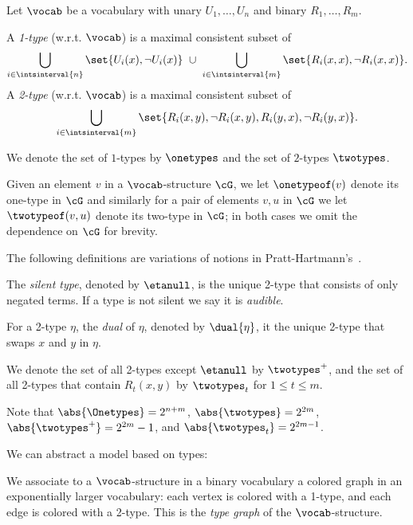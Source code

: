 Let $\vocab$ be a vocabulary with unary  $U_1, \ldots, U_n$ and binary  $R_1, \ldots, R_m$.
\begin{definition}
    A \emph{1-type} (w.r.t. $\vocab$) is a maximal consistent subset of
    \begin{equation*}
        \bigcup_{i \in \intsinterval{n}}\set{U_i(x), \neg U_i(x)}
        \ \cup\ 
        \bigcup_{i \in \intsinterval{m}}\set{R_i(x, x), \neg R_i(x, x)}.
    \end{equation*}
    A \emph{2-type} (w.r.t. $\vocab$) is a maximal consistent subset of
    \begin{equation*}
        \bigcup_{i \in \intsinterval{m}}
        \set{R_i(x, y), \neg R_i(x, y), R_i(y, x), \neg R_i(y, x)}.
    \end{equation*}
\end{definition}
We denote the set of $1$-types  by $\onetypes$ and the set of $2$-types $\twotypes$.

Given an element $v$ in a $\vocab$-structure $\cG$, we let $\onetypeof(v)$ denote its one-type in $\cG$
and similarly for a pair of elements $v, u$ in $\cG$ we let $\twotypeof(v,u)$ denote its two-type in $\cG$;
in both cases we omit the dependence on $\cG$ for brevity.

The following definitions are variations of notions
in Pratt-Hartmann's~\cite{ctwocomplexity,gctwocomplexity,ianrevisited}.

\begin{definition}
    The \emph{silent type}, denoted by $\etanull$, is the unique 2-type that consists of only negated terms.
    If a type is not silent we say it is \emph{audible}.
\end{definition}

\begin{definition}
    For a 2-type $\eta$, the \emph{dual} of $\eta$, denoted by $\dual{\eta}$,
    it the unique 2-type that swaps $x$ and $y$ in $\eta$.
\end{definition}
We denote
the set of all 2-types except $\etanull$ by $\twotypes^+$, and
the set of all 2-types that contain $R_t(x, y)$ by $\twotypes_t$ for $1 \le t \le m$.

Note that $\abs{\Onetypes} = 2^{n+m}$,
$\abs{\twotypes} = 2^{2m}$, $\abs{\twotypes^+} = 2^{2m}-1$,
and $\abs{\twotypes_t} =2^{2m-1}$.

We can abstract a model based on types:
\begin{definition}
    We associate to a $\vocab$-structure in a binary vocabulary a colored graph in an exponentially larger vocabulary:
    each vertex is colored with a 1-type, and
    each edge is colored with a 2-type. This is the \emph{type graph} of the $\vocab$-structure.
\end{definition}


